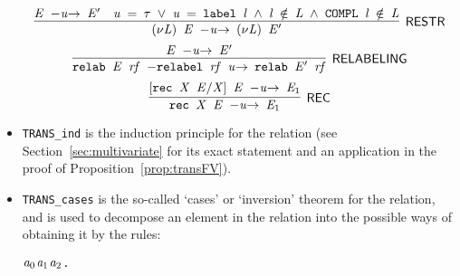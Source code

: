 \begin{itemize}
\begin{equation*}
\end{equation*}
\begin{equation*}
\infer[\HOLRuleName{RESTR}]{\HOLinline{\ensuremath{(\nu}\HOLFreeVar{L}\ensuremath{)} \HOLFreeVar{E} \HOLTokenTransBegin\HOLFreeVar{u}\HOLTokenTransEnd \ensuremath{(\nu}\HOLFreeVar{L}\ensuremath{)} \ensuremath{\HOLFreeVar{E}\sp{\prime}}}}{\HOLinline{\HOLFreeVar{E} \HOLTokenTransBegin\HOLFreeVar{u}\HOLTokenTransEnd \ensuremath{\HOLFreeVar{E}\sp{\prime}}}&\HOLinline{\HOLFreeVar{u} \HOLSymConst{\ensuremath{=}} \HOLSymConst{\ensuremath{\tau}} \HOLSymConst{\HOLTokenDisj{}} \HOLFreeVar{u} \HOLSymConst{\ensuremath{=}} \HOLConst{label} \HOLFreeVar{l} \HOLSymConst{\HOLTokenConj{}} \HOLFreeVar{l} \HOLSymConst{\HOLTokenNotIn{}} \HOLFreeVar{L} \HOLSymConst{\HOLTokenConj{}} \HOLConst{COMPL} \HOLFreeVar{l} \HOLSymConst{\HOLTokenNotIn{}} \HOLFreeVar{L}}}
\end{equation*}
\begin{equation*}
\infer[\HOLRuleName{RELABELING}]{\HOLinline{\HOLConst{relab} \HOLFreeVar{E} \HOLFreeVar{rf} \HOLTokenTransBegin\HOLConst{relabel} \HOLFreeVar{rf} \HOLFreeVar{u}\HOLTokenTransEnd \HOLConst{relab} \ensuremath{\HOLFreeVar{E}\sp{\prime}} \HOLFreeVar{rf}}}{\HOLinline{\HOLFreeVar{E} \HOLTokenTransBegin\HOLFreeVar{u}\HOLTokenTransEnd \ensuremath{\HOLFreeVar{E}\sp{\prime}}}}
\end{equation*}
\begin{equation*}
\infer[\HOLRuleName{REC}]{\HOLinline{\HOLConst{rec} \HOLFreeVar{X} \HOLFreeVar{E} \HOLTokenTransBegin\HOLFreeVar{u}\HOLTokenTransEnd \ensuremath{\HOLFreeVar{E}\sb{\mathrm{1}}}}}{\HOLinline{\ensuremath{[}\HOLConst{rec} \HOLFreeVar{X} \HOLFreeVar{E}\ensuremath{/}\HOLFreeVar{X}\ensuremath{]} \HOLFreeVar{E} \HOLTokenTransBegin\HOLFreeVar{u}\HOLTokenTransEnd \ensuremath{\HOLFreeVar{E}\sb{\mathrm{1}}}}}
\end{equation*}
\item \texttt{TRANS_ind} is the induction principle for the relation
  (see Section~\ref{sec:multivariate} for its exact statement and an
  application in the proof of Proposition~\ref{prop:transFV}).
\item \texttt{TRANS_cases} is the so-called `cases' or `inversion' theorem for
  the relation, and is used to decompose an element in the relation into the possible ways of
  obtaining it by the rules:
\begin{alltt}
\HOLTokenTurnstile{} \HOLSymConst{\HOLTokenForall{}}\ensuremath{\HOLBoundVar{a}\sb{\mathrm{0}}} \ensuremath{\HOLBoundVar{a}\sb{\mathrm{1}}} \ensuremath{\HOLBoundVar{a}\sb{\mathrm{2}}}.

\end{alltt}
\end{itemize}

